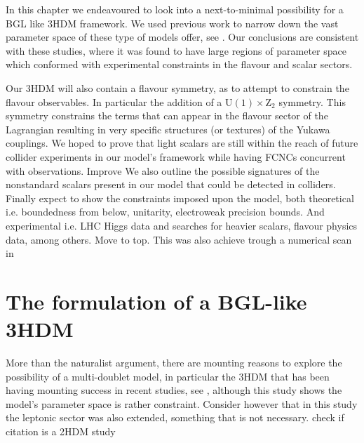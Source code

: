 In this chapter we endeavoured to look into a next-to-minimal possibility for a BGL like 3HDM framework. 
%
%
We used previous work to narrow down the vast parameter space of these type of models offer, see \cite{Ferreira_2018,Ivanov_2012,Ivanov_2016,Aranda_2017}.
%
Our conclusions are consistent with these studies, where it was found to have large regions of parameter space which conformed with experimental constraints in the flavour and scalar sectors.

Our 3HDM will also contain a flavour symmetry, as to attempt to constrain the flavour observables. In particular the addition of a $\mathrm{U}(1) \times \mathrm{Z}_2$ symmetry. This symmetry constrains the terms that can appear in the flavour sector of the Lagrangian resulting in very specific structures (or textures) of the Yukawa couplings.
%
We hoped to prove that light scalars are still within the reach of future collider experiments in our model's framework while having FCNCs concurrent with observations. {\color{blue} Improve} 
%
We also outline the possible signatures of the nonstandard scalars present in our model that could be detected in colliders. Finally expect to show the constraints imposed upon the model, both theoretical i.e. boundedness from
below, unitarity, electroweak precision bounds. And experimental i.e. LHC Higgs data and searches for heavier scalars, flavour physics data, among others. {\color{blue} Move to top}. This was also achieve trough a numerical scan in 

\section{The formulation of a BGL-like 3HDM} 

More than the naturalist argument, there are mounting reasons to explore the possibility of a multi-doublet model, in particular the 3HDM that has been having mounting success in recent studies, see \cite{Botella_2014}, although this study shows the model's parameter space is rather constraint. 
%
Consider however that in this study the leptonic sector was also extended, something that is not necessary. { \color{blue} check if citation is a 2HDM study} 

